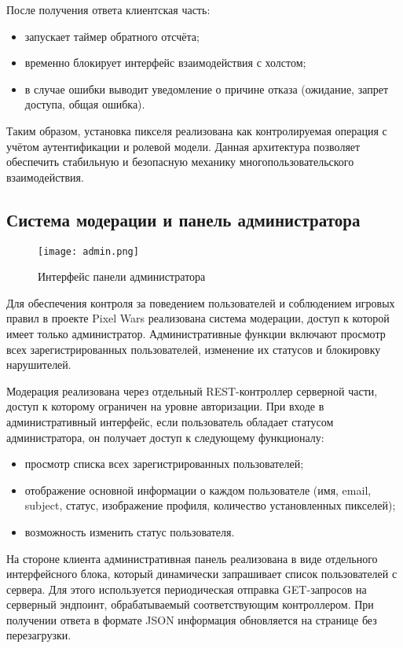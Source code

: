 После получения ответа клиентская часть:
\begin{itemize}
    \item запускает таймер обратного отсчёта;
    \item временно блокирует интерфейс взаимодействия с холстом;
    \item в случае ошибки выводит уведомление о причине отказа (ожидание, запрет доступа, общая ошибка).
\end{itemize}

Таким образом, установка пикселя реализована как контролируемая операция с учётом аутентификации и ролевой модели. Данная архитектура позволяет обеспечить стабильную и безопасную механику многопользовательского взаимодействия.

\subsection{Система модерации и панель администратора}

\begin{figure}[!h]
    \texttt{[image: admin.png]}
    \caption{Интерфейс панели администратора}
\end{figure}

Для обеспечения контроля за поведением пользователей и соблюдением игровых правил в проекте Pixel Wars реализована система модерации, доступ к которой имеет только администратор. Административные функции включают просмотр всех зарегистрированных пользователей, изменение их статусов и блокировку нарушителей.

Модерация реализована через отдельный REST-контроллер серверной части, доступ к которому ограничен на уровне авторизации. При входе в административный интерфейс, если пользователь обладает статусом администратора, он получает доступ к следующему функционалу:
\begin{itemize}
    \item просмотр списка всех зарегистрированных пользователей;
    \item отображение основной информации о каждом пользователе (имя, email, subject, статус, изображение профиля, количество установленных пикселей);
    \item возможность изменить статус пользователя.
\end{itemize}

На стороне клиента административная панель реализована в виде отдельного интерфейсного блока, который динамически запрашивает список пользователей с сервера. Для этого используется периодическая отправка GET-запросов на серверный эндпоинт, обрабатываемый соответствующим контроллером. При получении ответа в формате JSON информация обновляется на странице без перезагрузки.

